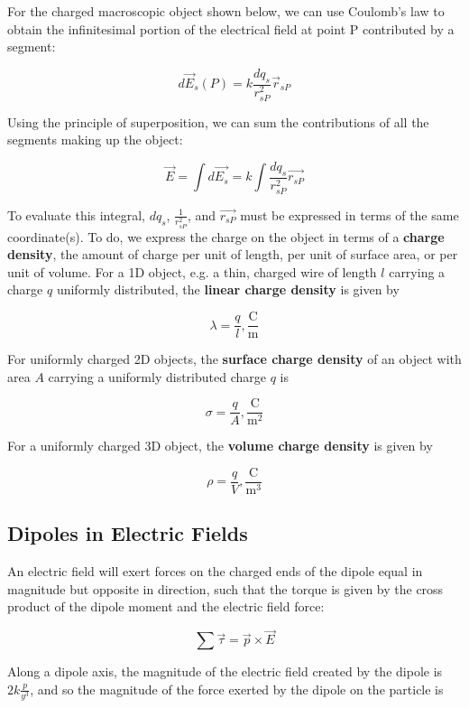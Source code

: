         For the charged macroscopic object shown below, we can use Coulomb's law to obtain the infinitesimal portion of the electrical field at point P contributed by a segment:

        \[
            d\vec{E}_s (P) = k \frac{dq_s}{r^2_{sP}} \vec{r}_{sP}
        \]

        Using the principle of superposition, we can sum the contributions of all the segments making up the object:

        \[
            \vec{E} = \int d\vec{E_s} = k\int \frac{dq_s}{r^2_{sP}} \vec{r_{sP}}
        \]

        To evaluate this integral, $dq_s$, $\frac{1}{r^2_{sP}}$, and $\vec{r_{sP}}$ must be expressed in terms of the same coordinate(s). To do, we express the charge on the object in terms of a \textbf{charge density},
        the amount of charge per unit of length, per unit of surface area, or per unit of volume. For a 1D object, e.g. a thin, charged wire of length $l$ carrying a charge $q$ uniformly distributed, the
        \textbf{linear charge density} is given by

        \[
            \lambda = \frac{q}{l}, \frac{\text{C}}{\text{m}}
        \]

        For uniformly charged 2D objects, the \textbf{surface charge density} of an object with area $A$ carrying a uniformly distributed charge $q$ is

        \[
            \sigma = \frac{q}{A}, \frac{\text{C}}{\text{m}^2}
        \]

        For a uniformly charged 3D object, the \textbf{volume charge density} is given by

        \[
            \rho = \frac{q}{V}, \frac{\text{C}}{\text{m}^3}
        \]

    \subsection{Dipoles in Electric Fields}     %

        An electric field will exert forces on the charged ends of the dipole equal in magnitude but opposite in direction, such that the torque is given by the cross product of the dipole moment and the electric field
        force:

        \[
            \sum \vec{\tau} = \vec{p} \times \vec{E}
        \]

        Along a dipole axis, the magnitude of the electric field created by the dipole is $2k\frac{p}{y^3}$, and so the magnitude of the force exerted by the dipole on the particle is


